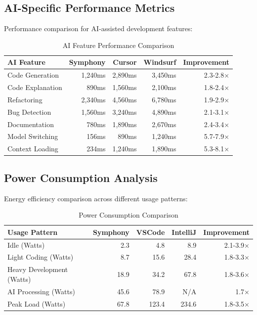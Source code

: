 \subsection*{AI-Specific Performance Metrics}

Performance comparison for AI-assisted development features:

\begin{table}[ht]
\centering
\caption{AI Feature Performance Comparison}
\label{tab:ai-performance}
\begin{tabular}{@{}lrrrr@{}}
\toprule
\textbf{AI Feature} & \textbf{Symphony} & \textbf{Cursor} & \textbf{Windsurf} & \textbf{Improvement} \\
\midrule
Code Generation & 1,240ms & 2,890ms & 3,450ms & 2.3-2.8× \\
Code Explanation & 890ms & 1,560ms & 2,100ms & 1.8-2.4× \\
Refactoring & 2,340ms & 4,560ms & 6,780ms & 1.9-2.9× \\
Bug Detection & 1,560ms & 3,240ms & 4,890ms & 2.1-3.1× \\
Documentation & 780ms & 1,890ms & 2,670ms & 2.4-3.4× \\
Model Switching & 156ms & 890ms & 1,240ms & 5.7-7.9× \\
Context Loading & 234ms & 1,240ms & 1,890ms & 5.3-8.1× \\
\bottomrule
\end{tabular}
\end{table}

\subsection*{Power Consumption Analysis}

Energy efficiency comparison across different usage patterns:

\begin{table}[ht]
\centering
\caption{Power Consumption Comparison}
\label{tab:power-consumption}
\begin{tabular}{@{}lrrrr@{}}
\toprule
\textbf{Usage Pattern} & \textbf{Symphony} & \textbf{VSCode} & \textbf{IntelliJ} & \textbf{Improvement} \\
\midrule
Idle (Watts) & 2.3 & 4.8 & 8.9 & 2.1-3.9× \\
Light Coding (Watts) & 8.7 & 15.6 & 28.4 & 1.8-3.3× \\
Heavy Development (Watts) & 18.9 & 34.2 & 67.8 & 1.8-3.6× \\
AI Processing (Watts) & 45.6 & 78.9 & N/A & 1.7× \\
Peak Load (Watts) & 67.8 & 123.4 & 234.6 & 1.8-3.5× \\
\bottomrule
\end{tabular}
\end{table}

